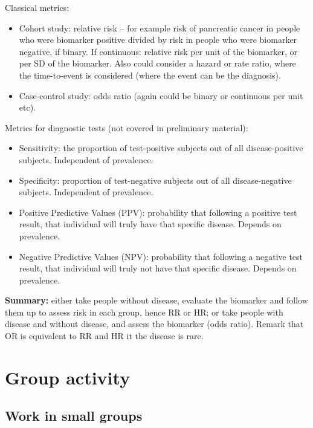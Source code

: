 \documentclass[a4paper,11pt]{scrartcl}
\theoremstyle{plain}
\theoremstyle{remark}
\theoremstyle{definition}
\begin{document}
\begin{itshape}
Classical metrics:
\begin{itemize}
\item Cohort study: relative risk – for example risk of pancreatic cancer in people who were biomarker positive divided by risk  in people who were biomarker negative, if binary. If continuous: relative risk per unit of the biomarker, or per SD of the biomarker. Also could consider a hazard or rate ratio, where the time-to-event is considered (where the event can be the diagnosis).
\item Case-control study:  odds ratio (again could be binary or continuous per unit etc).
\end{itemize}

Metrics for diagnostic tests (not covered in preliminary material):
\begin{itemize}
\item Sensitivity: the proportion of test-positive subjects out of all disease-positive subjects. Independent of prevalence.
\item Specificity: proportion of test-negative subjects out of all disease-negative subjects. Independent of prevalence.
\item Positive Predictive Values (PPV): probability that following a positive test result, that individual will truly have that specific disease. Depends on prevalence. 
\item Negative Predictive Values (NPV): probability that following a negative test result, that individual will truly not have that specific disease. Depends on prevalence. 
\end{itemize}

	\textbf{Summary:} either take people without disease, evaluate the biomarker and follow them up to assess risk in each group, hence RR or HR; or take people with disease and without disease, and assess the biomarker (odds ratio). Remark that OR is equivalent to RR and HR it the disease is rare.

\end{itshape}
\section{Group activity}

\subsection{Work in small groups}
\end{document}
